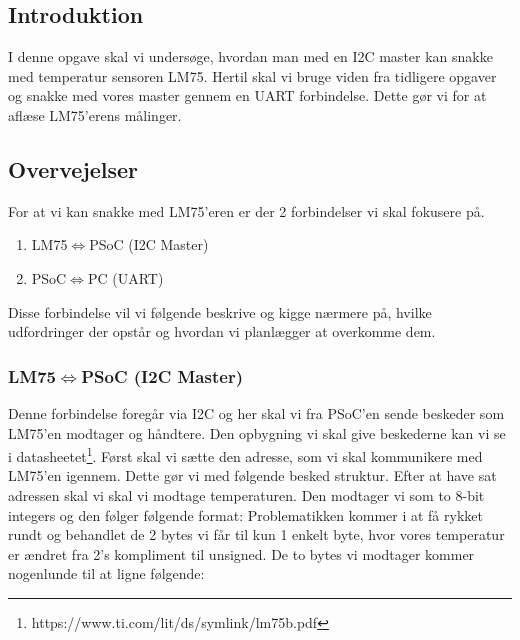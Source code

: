 \documentclass[../main.tex]{subfiles}
\begin{document}
\subsection{Introduktion}
I denne opgave skal vi undersøge, hvordan man med en I2C master kan snakke med temperatur sensoren LM75.
Hertil skal vi bruge viden fra tidligere opgaver og snakke med vores master gennem en UART forbindelse. 
Dette gør vi for at aflæse LM75'erens målinger.

\subsection{Overvejelser}
For at vi kan snakke med LM75'eren er der 2 forbindelser vi skal fokusere på.
\begin{enumerate}
    \item LM75$\iff$PSoC (I2C Master)
    \item PSoC$\iff$PC (UART)
\end{enumerate}
Disse forbindelse vil vi følgende beskrive og kigge nærmere på, hvilke udfordringer der opstår og hvordan vi planlægger at overkomme dem.

\subsubsection{LM75$\iff$PSoC (I2C Master)} \label{sec:i2cmaster}
Denne forbindelse foregår via I2C og her skal vi fra PSoC'en sende beskeder som LM75'en modtager og håndtere. Den opbygning vi skal give beskederne kan vi se i datasheetet\footnote{https://www.ti.com/lit/ds/symlink/lm75b.pdf}.
Først skal vi sætte den adresse, som vi skal kommunikere med LM75'en igennem. Dette gør vi med følgende besked struktur.
Efter at have sat adressen skal vi skal vi modtage temperaturen. Den modtager vi som to 8-bit integers og den følger følgende format:
Problematikken kommer i at få rykket rundt og behandlet de 2 bytes vi får til kun 1 enkelt byte, hvor vores temperatur er ændret fra 2's kompliment til unsigned.
De to bytes vi modtager kommer nogenlunde til at ligne følgende:
\end{document}
